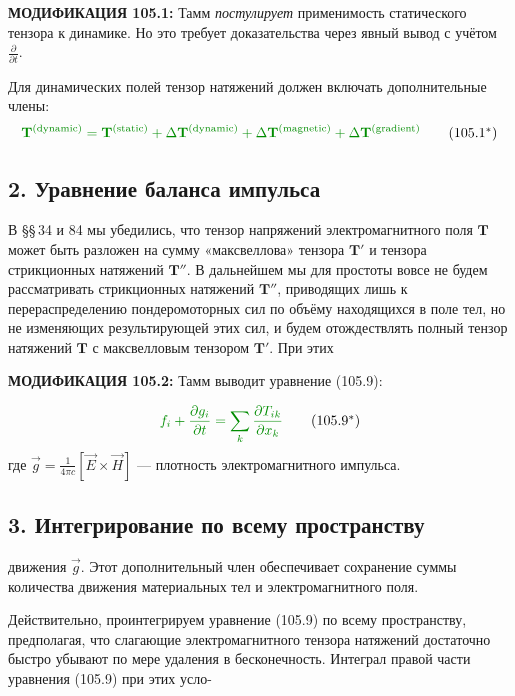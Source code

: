 \documentclass[a4paper,12pt]{article}
\newcommand{\modtext}[1]{\textcolor{modcolor}{#1}}
\newcommand{\modmath}[1]{\textcolor{modcolor}{#1}}
\newcommand{\modblock}[1]{\colorbox{modcolor!10}{\parbox{\dimexpr\linewidth-2\fboxsep}{#1}}}
\begin{document}
\modtext{
\textbf{МОДИФИКАЦИЯ 105.1:} Тамм \textit{постулирует} применимость статического
тензора к динамике. Но это требует доказательства через явный вывод с учётом
$\frac{\partial}{\partial t}$.
}

\modblock{
\modtext{
Для динамических полей тензор натяжений должен включать дополнительные члены:
\begin{equation}
\modmath{
\mathbf{T}^{\text{(dynamic)}} = \mathbf{T}^{\text{(static)}} +
\Delta\mathbf{T}^{\text{(dynamic)}} +
\Delta\mathbf{T}^{\text{(magnetic)}} +
\Delta\mathbf{T}^{\text{(gradient)}}
}
\tag{105.1$^*$}
\end{equation}
}
}

\subsection*{2. Уравнение баланса импульса}

\noindent
В §§\,34 и 84 мы убедились, что тензор напряжений электромагнитного
поля $\mathbf{T}$ может быть разложен на сумму «максвеллова» тензора
$\mathbf{T}'$ и тензора стрикционных натяжений $\mathbf{T}''$. В
дальнейшем мы для простоты вовсе не будем рассматривать стрикционных
натяжений $\mathbf{T}''$, приводящих лишь к перераспределению
пондеромоторных сил по объёму находящихся в поле тел, но не изменяющих
результирующей этих сил, и будем отождествлять полный тензор натяжений
$\mathbf{T}$ с максвелловым тензором $\mathbf{T}'$. При этих

\modtext{
\textbf{МОДИФИКАЦИЯ 105.2:} Тамм выводит уравнение (105.9):
}

\modblock{
\modtext{
\begin{equation}
\modmath{
f_i + \frac{\partial g_i}{\partial t} = \sum_k \frac{\partial T_{ik}}{\partial x_k}
}
\tag{105.9$^*$}
\end{equation}
где $\vec{g} = \frac{1}{4\pi c}[\vec{E}\times\vec{H}]$ — плотность электромагнитного
импульса.
}
}

\subsection*{3. Интегрирование по всему пространству}

\noindent
движения $\vec{g}$. Этот
дополнительный член обеспечивает сохранение суммы количества движения
материальных тел и электромагнитного поля.

Действительно, проинтегрируем уравнение (105.9) по всему пространству,
предполагая, что слагающие электромагнитного тензора натяжений достаточно
быстро убывают по мере удаления в бесконечность. Интеграл правой части
уравнения (105.9) при этих усло-
\end{document}
